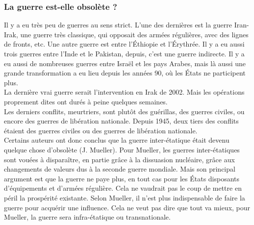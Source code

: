 \documentclass[10pt, a4paper, openany]{book}
\begin{document}
\subsubsection{La guerre est-elle obsolète ?}

Il y a eu très peu de guerres au sens strict. L'une des dernières est la guerre Iran-Irak, une guerre très classique, qui opposait des armées régulières, avec des lignes de fronts, etc. Une autre guerre est entre l'Éthiopie et l'Érythrée. Il y a eu aussi trois guerres entre l'Inde et le Pakistan, depuis, c'est une guerre indirecte. Il y a eu aussi de nombreuses guerres entre Israël et les pays Arabes, mais là aussi une grande transformation a eu lieu depuis les années 90, où les États ne participent plus. \\
La dernière vrai guerre serait l'intervention en Irak de 2002. Mais les opérations proprement dites ont durés à peine quelques semaines. \\
Les derniers conflits, meurtriers, sont plutôt des guérillas, des guerres civiles, ou encore des guerres de libération nationale. Depuis 1945, deux tiers des conflits étaient des guerres civiles ou des guerres de libération nationale. \\
Certains auteurs ont donc conclus que la guerre inter-étatique était devenu quelque chose d'obsolète (J. Mueller). Pour Mueller, les guerres inter-étatiques sont vouées à disparaître, en partie grâce à la dissuasion nucléaire, grâce aux changements de valeurs dus à la seconde guerre mondiale. Mais son principal argument est que la guerre ne paye plus, en tout cas pour les États disposants d'équipements et d'armées régulière. Cela ne vaudrait pas le coup de mettre en péril la prospérité existante. Selon Mueller, il n'est plus indispensable de faire la guerre pour acquérir une influence. Cela ne veut pas dire que tout va mieux, pour Mueller, la guerre sera infra-étatique ou transnationale. 
\end{document}
